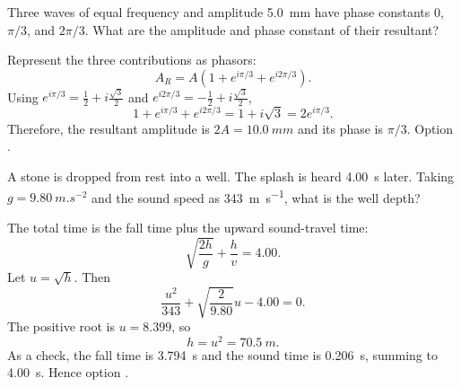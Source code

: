 \begin{quizquestion}[
  id=phy104-wave-051,
  topic=waves-and-sound,
  difficulty=challenge,
  marks=3,
  correct=C,
  tags={superposition,phasors,resultant-wave},
  outcome={Combine several equal-frequency waves by phasor addition}
]
  Three waves of equal frequency and amplitude \SI{5.0}{mm} have phase constants \(0\), \(\pi/3\), and \(2\pi/3\). What are the amplitude and phase constant of their resultant?
\end{quizquestion}
\begin{quizsolution}
  Represent the three contributions as phasors:
    \[
      A_R=A\left(1+e^{i\pi/3}+e^{i2\pi/3}\right).
    \]
    Using \(e^{i\pi/3}=\tfrac12+i\tfrac{\sqrt3}{2}\) and \(e^{i2\pi/3}=-\tfrac12+i\tfrac{\sqrt3}{2}\),
    \[
      1+e^{i\pi/3}+e^{i2\pi/3}=1+i\sqrt3=2e^{i\pi/3}.
    \]
    Therefore, the resultant amplitude is \(2A=\SI{10.0}{mm}\) and its phase is \(\pi/3\). Option \textbf{\quizcorrectletter}.
\end{quizsolution}

\begin{quizquestion}[
  id=phy104-wave-052,
  topic=waves-and-sound,
  difficulty=challenge,
  marks=3,
  correct=B,
  tags={falling-body,sound-travel,time-of-flight},
  outcome={Combine fall time and sound travel time to find depth}
]
  A stone is dropped from rest into a well. The splash is heard \SI{4.00}{s} later. Taking \(g=\SI{9.80}{m.s^{-2}}\) and the sound speed as \SI{343}{m.s^{-1}}, what is the well depth?
\end{quizquestion}
\begin{quizsolution}
  The total time is the fall time plus the upward sound-travel time:
    \[
      \sqrt{\frac{2h}{g}}+\frac{h}{v}=4.00.
    \]
    Let \(u=\sqrt{h}\). Then
    \[
      \frac{u^2}{343}+\sqrt{\frac{2}{9.80}}u-4.00=0.
    \]
    The positive root is \(u=8.399\), so
    \[
      h=u^2=\SI{70.5}{m}.
    \]
    As a check, the fall time is \SI{3.794}{s} and the sound time is \SI{0.206}{s}, summing to \SI{4.00}{s}. Hence option \textbf{\quizcorrectletter}.
\end{quizsolution}

